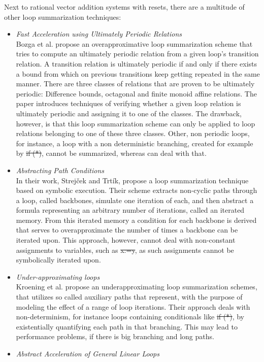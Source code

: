 
Next to rational vector addition systems with resets, there are a multitude of other loop summarization techniques:

\begin{itemize}
	\item \textsl{Fast Acceleration using Ultimately Periodic Relations}\cite{10.1007/978-3-642-14295-6_23}\\ Bozga et al. propose an overapproximative loop summarization scheme that tries to compute an ultimately periodic relation from a given loop's transition relation. A transition relation is ultimately periodic if and only if there exists a bound from which on previous transitions keep getting repeated in the same manner. There are three classes of relations that are proven to be ultimately periodic: Difference bounds, octagonal and finite monoid affine relations. The paper introduces techniques of verifying whether a given loop relation is ultimately periodic and assigning it to one of the classes. The drawback, however, is that this loop summarization scheme can only be applied to loop relations belonging to one of these three classes. Other, non periodic loops, for instance, a loop with a non deterministic branching, created for example by \st{if (*)}, cannot be summarized, whereas \qvasr can deal with that.
	
	\item \textsl{Abstracting Path Conditions}\cite{DBLP:conf/issta/StrejcekT12} \\
	In their work, Strejček and Trtík, propose a loop summarization technique based on symbolic execution. Their scheme extracts non-cyclic paths through a loop, called backbones, simulate one iteration of each, and then abstract a formula representing an arbitrary number of iterations, called an iterated memory. From this iterated memory a condition for each backbone is derived that serves to overapproximate the number of times a backbone can be iterated upon. This approach, however, cannot deal with non-constant assignments to variables, such as \st{x:=y}, as such assignments cannot be symbolically iterated upon.
	
	\item \textsl{Under-approximating loops}\cite{DBLP:conf/cav/KroeningLW13} \\
	Kroening et al. propose an underapproximating loop summarization schemes, that utilizes so called auxiliary paths that represent, with the purpose of modeling the effect of a range of loop iterations. Their approach deals with non-determinism, for instance loops containing conditionals like \st{if (*)}, by existentially quantifying each path in that branching. This may lead to performance problems, if there is big branching and long paths.
	
	\item \textsl{Abstract Acceleration of General Linear Loops}\cite{DBLP:conf/popl/JeannetSS14}
\end{itemize}